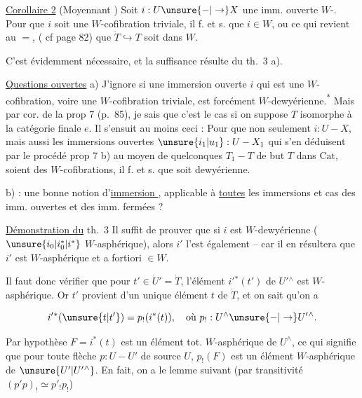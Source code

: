 \uline{Corollaire 2} (Moyennant ) Soit $i:U\unsure{-|\to}X$ une imm. ouverte $W$-. Pour que $i$ soit une $W$-cofibration triviale, il f. et s. que $i\in W$, ou ce qui revient au $=$, ( cf page 82) que $\dot T\hookrightarrow T$ soit dans $W$.

C'est évidemment nécessaire, et la suffisance résulte du th.~3 a).

\uline{Questions ouvertes} a) J'ignore si une immersion ouverte $i$ qui est une $W$-cofibration, voire une $W$-cofibration triviale, est forcément $W$-dewyérienne.\textsuperscript{*}
 Mais par  cor. de la prop 7 (p.~85), je sais que c'est le cas si on suppose $T$ isomorphe à la catégorie finale $e$. Il s'ensuit  au moins ceci : Pour que non seulement $i:U-X$, mais aussi  les immersions ouvertes $\unsure{i_1|u_1}:U-X_1$ qui s'en déduisent par le procédé  prop 7 b) au moyen de  quelconques $T_1-T$ de but $T$ dans $\mathrm{Cat}$, soient des $W$-cofibrations, il f. et s. que  soit dewyérienne.

b) :  une bonne notion d'\uline{immersion }, applicable à \uline{toutes} les immersions
et  cas des imm. ouvertes et des imm. fermées ?

\uline{Démonstration du} th.~3  Il suffit de prouver que si $i$ est $W$-dewyérienne ( $\unsure{i_0|i^*_0|i^*}$  $W$-asphérique), alors $i'$ l'est également -- car il en résultera que $i'$ est $W$-asphérique et a fortiori $\in W$.

Il faut donc vérifier que pour  $t'\in\dot U'=\dot T$, l'élément $i'{}^*(t')$  de $U'{}^\wedge$ est  $W$-asphérique. Or $t'$ provient d'un unique élément $t$ de $\dot T$, et on sait qu'on a

\[
i'{}^*(\unsure{t|t'})=p_!(i^*(t)),\quad\text{où }p_!:U^\wedge\unsure{-|\to}U'{}^\wedge .
\]

Par hypothèse $F=i^*(t)$ est un élément tot. $W$-asphérique de $U^\wedge$, ce qui signifie que pour toute flèche $p:U-U'$  de source $U$, $p_!(F)$ est un élément $W$-asphérique de $\unsure{U'|U'{}^\wedge}$. En fait, on a le lemme suivant (par transitivité $(p'p)_!\simeq p'_!p_!$)

